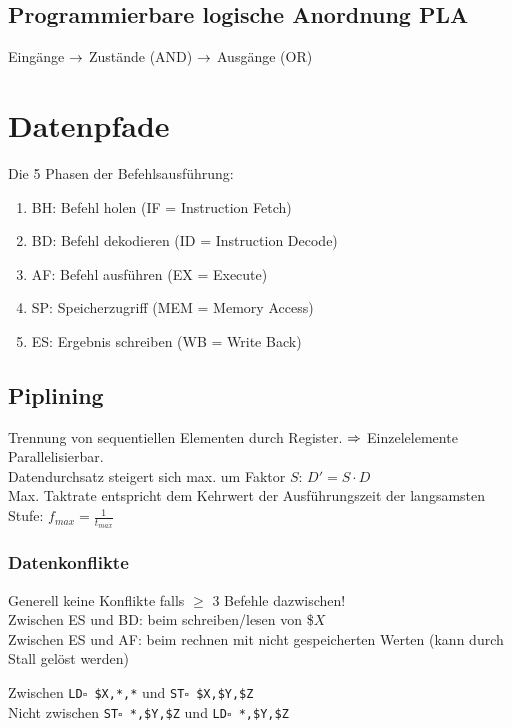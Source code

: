 \documentclass[fs]{latex4ei}
\begin{document}
\begin{multicols}{4}
		
		
\subsection{Programmierbare logische Anordnung PLA}
Eingänge $\rightarrow$ Zustände (AND) $\rightarrow$ Ausgänge (OR)\\



\section{Datenpfade}
Die 5 Phasen der Befehlsausführung:\\
\begin{enumerate}\itemsep0pt
	\item BH: Befehl holen (IF = Instruction Fetch)
	\item BD: Befehl dekodieren (ID = Instruction Decode)
	\item AF: Befehl ausführen (EX = Execute)
	\item SP: Speicherzugriff (MEM = Memory Access)
	\item ES: Ergebnis schreiben (WB = Write Back)
\end{enumerate}


\subsection{Piplining}
Trennung von sequentiellen Elementen durch Register. $\Rightarrow$ Einzelelemente Parallelisierbar.\\
Datendurchsatz steigert sich max. um Faktor $S$: $D' = S \cdot D$\\
Max. Taktrate entspricht dem Kehrwert der Ausführungszeit der langsamsten Stufe: $f_{max} = \frac{1}{t_{max}}$\\

	\subsubsection{Datenkonflikte}
	Generell keine Konflikte falls $\ge$ 3 Befehle dazwischen!\\
	Zwischen ES und BD: beim schreiben/lesen von \$$X$\\
	Zwischen ES und AF: beim rechnen mit nicht gespeicherten Werten (kann durch Stall gelöst werden)
	
	Zwischen \texttt{LD$\square$ \$X,*,*} und \texttt{ST$\square$ \$X,\$Y,\$Z}\\
	Nicht zwischen \texttt{ST$\square$ *,\$Y,\$Z} und \texttt{LD$\square$ *,\$Y,\$Z}
	

\end{multicols}
\end{document}
